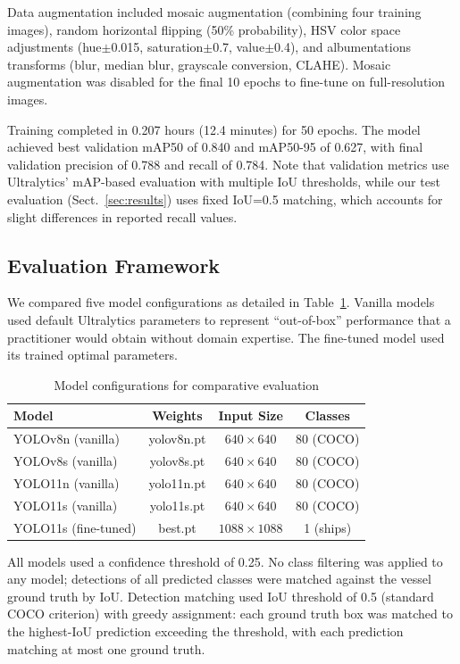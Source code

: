 \documentclass[pdflatex,sn-mathphys-num,Numbered]{sn-jnl}
\begin{document}
Data augmentation included mosaic augmentation (combining four training images), random horizontal flipping (50\% probability), HSV color space adjustments (hue$\pm$0.015, saturation$\pm$0.7, value$\pm$0.4), and albumentations transforms (blur, median blur, grayscale conversion, CLAHE). Mosaic augmentation was disabled for the final 10 epochs to fine-tune on full-resolution images.

Training completed in 0.207 hours (12.4 minutes) for 50 epochs. The model achieved best validation mAP50 of 0.840 and mAP50-95 of 0.627, with final validation precision of 0.788 and recall of 0.784. Note that validation metrics use Ultralytics' mAP-based evaluation with multiple IoU thresholds, while our test evaluation (Sect.~\ref{sec:results}) uses fixed IoU=0.5 matching, which accounts for slight differences in reported recall values.

\subsection{Evaluation Framework}\label{subsec:evaluation}

We compared five model configurations as detailed in Table~\ref{tab:models}. Vanilla models used default Ultralytics parameters to represent ``out-of-box'' performance that a practitioner would obtain without domain expertise. The fine-tuned model used its trained optimal parameters.

\begin{table}[!ht]
\centering
\caption{Model configurations for comparative evaluation}\label{tab:models}
\begin{tabular}{lccc}
\toprule
\textbf{Model} & \textbf{Weights} & \textbf{Input Size} & \textbf{Classes} \\
\midrule
YOLOv8n (vanilla) & yolov8n.pt & $640 \times 640$ & 80 (COCO) \\
YOLOv8s (vanilla) & yolov8s.pt & $640 \times 640$ & 80 (COCO) \\
YOLO11n (vanilla) & yolo11n.pt & $640 \times 640$ & 80 (COCO) \\
YOLO11s (vanilla) & yolo11s.pt & $640 \times 640$ & 80 (COCO) \\
YOLO11s (fine-tuned) & best.pt & $1088 \times 1088$ & 1 (ships) \\
\bottomrule
\end{tabular}
\end{table}

All models used a confidence threshold of 0.25. No class filtering was applied to any model; detections of all predicted classes were matched against the vessel ground truth by IoU. Detection matching used IoU threshold of 0.5 (standard COCO criterion) with greedy assignment: each ground truth box was matched to the highest-IoU prediction exceeding the threshold, with each prediction matching at most one ground truth.
\end{document}

